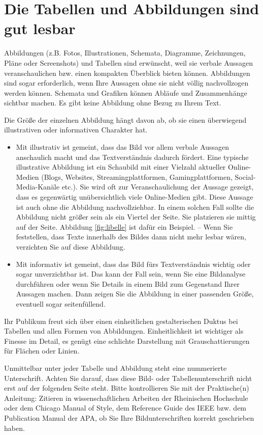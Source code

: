 \section{Die Tabellen und Abbildungen sind gut lesbar}
\label{sec:tabellen-abbildungen}

Abbildungen (z.B. Fotos, Illustrationen, Schemata, Diagramme, Zeichnungen, Pläne oder Screenshots) und Tabellen sind erwünscht, weil sie verbale Aussagen veranschaulichen bzw. einen kompakten Überblick bieten können. Abbildungen sind sogar erforderlich, wenn Ihre Aussagen ohne sie nicht völlig nachvollzogen werden können. Schemata und Grafiken können Abläufe und Zusammenhänge sichtbar machen. Es gibt keine Abbildung ohne Bezug zu Ihrem Text.

Die Größe der einzelnen Abbildung hängt davon ab, ob sie einen überwiegend illustrativen oder informativen Charakter hat.
\begin{itemize}[label={--}]
\item Mit illustrativ ist gemeint, dass das Bild vor allem verbale Aussagen anschaulich macht und das Textverständnis dadurch fördert. Eine typische illustrative Abbildung ist ein Schaubild mit einer Vielzahl aktueller Online-Medien (Blogs, Websites, Streamingplattformen, Gamingplattformen, Social-Media-Kanäle etc.). Sie wird oft zur Veranschaulichung der Aussage gezeigt, dass es gegenwärtig unübersichtlich viele Online-Medien gibt. Diese Aussage ist auch ohne die Abbildung nachvollziehbar. In einem solchen Fall sollte die Abbildung nicht größer sein als ein Viertel der Seite. Sie platzieren sie mittig auf der Seite. Abbildung \ref{fig:libelle} ist dafür ein Beispiel. – Wenn Sie feststellen, dass Texte innerhalb des Bildes dann nicht mehr lesbar wären, verzichten Sie auf diese Abbildung.
\item Mit informativ ist gemeint, dass das Bild fürs Textverständnis wichtig oder sogar unverzichtbar ist. Das kann der Fall sein, wenn Sie eine Bildanalyse durchführen oder wenn Sie Details in einem Bild zum Gegenstand Ihrer Aussagen machen. Dann zeigen Sie die Abbildung in einer passenden Größe, eventuell sogar seitenfüllend.
\end{itemize}

Ihr Publikum freut sich über einen einheitlichen gestalterischen Duktus bei Tabellen und allen Formen von Abbildungen. Einheitlichkeit ist wichtiger als Finesse im Detail, es genügt eine schlichte Darstellung mit Grauschattierungen für Flächen oder Linien.

Unmittelbar unter jeder Tabelle und Abbildung steht eine nummerierte Unterschrift. Achten Sie darauf, dass diese Bild- oder Tabellenunterschrift nicht erst auf der folgenden Seite steht. Bitte kontrollieren Sie mit der Praktische(n) Anleitung: Zitieren in wissenschaftlichen Arbeiten der Rheinischen Hochschule oder dem Chicago Manual of Style, dem Reference Guide des IEEE bzw. dem Publication Manual der APA, ob Sie Ihre Bildunterschriften korrekt geschrieben haben.

